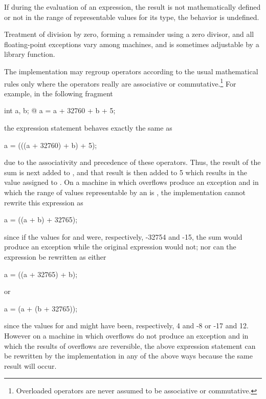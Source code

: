 \pnum
{}%
%
%
%
%
If during the evaluation of an expression, the result is not
mathematically defined or not in the range of representable values for
its type, the behavior is undefined.
\begin{note}
%
Treatment of division by zero, forming a remainder using a zero divisor,
and all floating-point exceptions vary among machines, and is sometimes
adjustable by a library function.
\end{note}

\pnum
{}%
%
\begin{note}
The implementation may regroup operators according to
the usual mathematical rules only
where the operators really are associative or commutative.\footnote{Overloaded
operators are never assumed to be associative or commutative.}
For example, in the following fragment
\begin{codeblock}
int a, b;
@\commentellip@
a = a + 32760 + b + 5;
\end{codeblock}
the expression statement behaves exactly the same as
\begin{codeblock}
a = (((a + 32760) + b) + 5);
\end{codeblock}
due to the associativity and precedence of these operators. Thus, the
result of the sum  is next added to , and
that result is then added to 5 which results in the value assigned to
. On a machine in which overflows produce an exception and in
which the range of values representable by an  is
, the implementation cannot rewrite this
expression as
\begin{codeblock}
a = ((a + b) + 32765);
\end{codeblock}
since if the values for  and  were, respectively,
-32754 and -15, the sum  would produce an exception while
the original expression would not; nor can the expression be rewritten
as either
\begin{codeblock}
a = ((a + 32765) + b);
\end{codeblock}
or
\begin{codeblock}
a = (a + (b + 32765));
\end{codeblock}
since the values for  and  might have been,
respectively, 4 and -8 or -17 and 12. However on a machine in which
overflows do not produce an exception and in which the results of
overflows are reversible, the above expression statement can be
rewritten by the implementation in any of the above ways because the
same result will occur.
\end{note}

